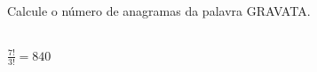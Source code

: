 \begin{ex}
Calcule o número de anagramas da palavra GRAVATA.
  \begin{sol}
    \phantom{A} \\
    $\frac{7!}{3!}=840$
  \end{sol}
\end{ex}